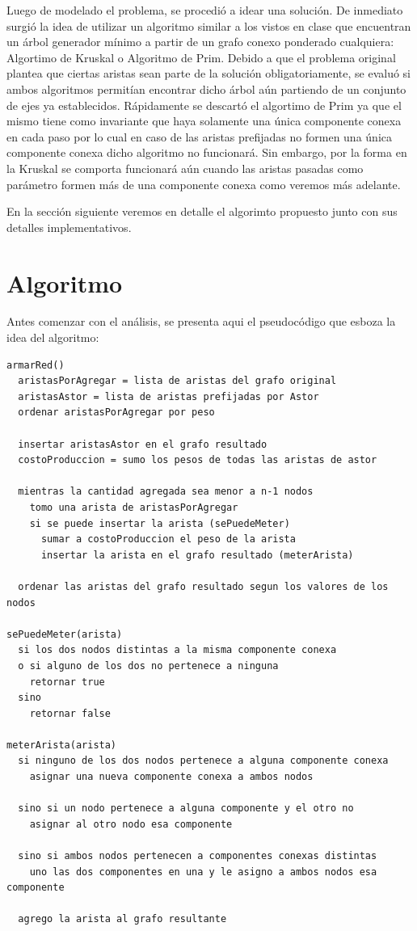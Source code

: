 \documentclass[a4paper,11pt] {article}
\begin{document}
Luego de modelado el problema, se procedió a idear una solución. De inmediato surgió la idea de utilizar un algoritmo similar a los vistos en clase que encuentran un árbol generador mínimo a partir de un grafo conexo ponderado cualquiera: Algortimo de Kruskal o Algoritmo de Prim. Debido a que el problema original plantea que ciertas aristas sean parte de la solución obligatoriamente, se evaluó si ambos algoritmos permitían encontrar dicho árbol aún partiendo de un conjunto de ejes ya establecidos. Rápidamente se descartó el algortimo de Prim ya que el mismo tiene como invariante que haya solamente una única componente conexa en cada paso por lo cual en caso de las aristas prefijadas no formen una única componente conexa dicho algoritmo no funcionará. Sin embargo, por la forma en la Kruskal se comporta funcionará aún cuando las aristas pasadas como parámetro formen más de una componente conexa como veremos más adelante.

En la sección siguiente veremos en detalle el algorimto propuesto junto con sus detalles implementativos.

\section*{Algoritmo}

Antes comenzar con el análisis, se presenta aqui el pseudocódigo que esboza la idea del algoritmo:

\begin{verbatim}
armarRed()
  aristasPorAgregar = lista de aristas del grafo original
  aristasAstor = lista de aristas prefijadas por Astor
  ordenar aristasPorAgregar por peso

  insertar aristasAstor en el grafo resultado
  costoProduccion = sumo los pesos de todas las aristas de astor

  mientras la cantidad agregada sea menor a n-1 nodos
    tomo una arista de aristasPorAgregar
    si se puede insertar la arista (sePuedeMeter)
      sumar a costoProduccion el peso de la arista
      insertar la arista en el grafo resultado (meterArista)

  ordenar las aristas del grafo resultado segun los valores de los nodos

sePuedeMeter(arista)
  si los dos nodos distintas a la misma componente conexa 
  o si alguno de los dos no pertenece a ninguna
    retornar true
  sino
    retornar false

meterArista(arista)
  si ninguno de los dos nodos pertenece a alguna componente conexa
    asignar una nueva componente conexa a ambos nodos

  sino si un nodo pertenece a alguna componente y el otro no
    asignar al otro nodo esa componente

  sino si ambos nodos pertenecen a componentes conexas distintas
    uno las dos componentes en una y le asigno a ambos nodos esa componente

  agrego la arista al grafo resultante
\end{verbatim}
\end{document}
